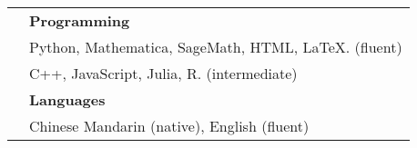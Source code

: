\documentclass[letterpaper, 11pt,times]{article}
\newcommand{\mycolor}[0]{\color{RoyalBlue}}
\newlength{\myl}
\newcommand{\ind}[0]{\hspace{\myl}}
\newlength{\newl}
\begin{document}
\begin{longtable}{p{1in}p{5in}}

{\mycolor{Skills}} 
& \textbf{Programming}\\
&\ind  Python, Mathematica, SageMath, HTML, \LaTeX. (fluent) \\
&\ind C++, JavaScript, Julia, R. (intermediate)\\
& \textbf{Languages} \\
&\ind  Chinese Mandarin (native), English (fluent) \\


\end{longtable}
\end{document}
